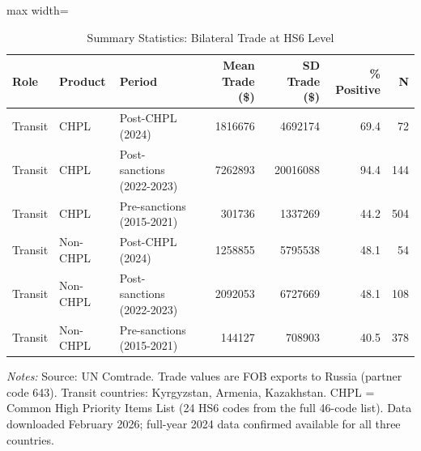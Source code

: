 \begin{table}[!h]
\centering
\caption{\label{tab:sumstats}Summary Statistics: Bilateral Trade at HS6 Level}
\centering
\small
\begin{adjustbox}{max width=\textwidth}
\begin{tabular}[t]{lllrrrr}
\toprule
Role & Product & Period & Mean Trade (\$) & SD Trade (\$) & \% Positive & N\\
\midrule
Transit & CHPL & Post-CHPL (2024) & 1816676 & 4692174 & 69.4 & 72\\
Transit & CHPL & Post-sanctions (2022-2023) & 7262893 & 20016088 & 94.4 & 144\\
Transit & CHPL & Pre-sanctions (2015-2021) & 301736 & 1337269 & 44.2 & 504\\
Transit & Non-CHPL & Post-CHPL (2024) & 1258855 & 5795538 & 48.1 & 54\\
Transit & Non-CHPL & Post-sanctions (2022-2023) & 2092053 & 6727669 & 48.1 & 108\\
\addlinespace
Transit & Non-CHPL & Pre-sanctions (2015-2021) & 144127 & 708903 & 40.5 & 378\\
\bottomrule
\end{tabular}
\end{adjustbox}
\par\vspace{0.3em}
{\footnotesize\textit{Notes:} Source: UN Comtrade. Trade values are FOB exports to Russia (partner code 643). Transit countries: Kyrgyzstan, Armenia, Kazakhstan. CHPL = Common High Priority Items List (24 HS6 codes from the full 46-code list). Data downloaded February 2026; full-year 2024 data confirmed available for all three countries.}
\end{table}
